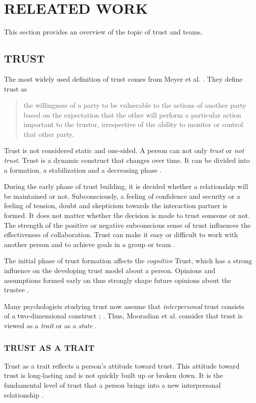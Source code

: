 \documentclass[sigchi]{acmart}
\begin{document}
\section{RELEATED WORK}
This section provides an overview of the topic of trust and teams.
\subsection{TRUST}
The most widely used definition of trust comes from Meyer et al. \citep[p. 712]{mayer1995integrative}. They define trust as
\begin{quote} \grqq{}the willingness of a party to be vulnerable to the actions of another party based on the expectation that the other will perform a particular action important to the trustor, irrespective of the ability to monitor or control that other party.\grqq{} \end{quote}

Trust is not considered static and one-sided. A person can not only \textit{trust} or \textit{not trust}. Trust is a dynamic construct that changes over time. It can be divided into a formation, a stabilization and a decreasing phase \citep[p. 396]{rousseau1998not}.

During the early phase of trust building, it is decided whether a relationship will be maintained or not. Subconsciously, a feeling of confidence and security or a feeling of tension, doubt and skepticism towards the interaction partner is formed.
It does not matter whether the decision is made to trust someone or not. The strength of the positive or negative subconscious sense of trust influences the effectiveness of collaboration. Trust can make it easy or difficult to work with another person and to achieve goals in a group or team \citep[p. 405-406]{bigley1998straining}.

The initial phase of trust formation affects the \textit{cognitive} Trust, which has a strong influence on the developing trust model about a person.
Opinions and assumptions formed early on thus strongly shape future opinions about the trustee \citep[pp. 461-462]{baldwin1992relational}.

Many psychologists studying trust now assume that \textit{interpersonal} trust consists of a two-dimensional construct \citep{johnson2005cognitive}; \citep{cook1980new}. Thus, Mooradian et al. consider that trust is viewed as a \textit{trait} or as a \textit{state} \citep[pp. 524-525]{mooradian2006trusts}.

\subsubsection{TRUST AS A TRAIT}
Trust as a trait reflects a person's attitude toward trust. This attitude toward trust is long-lasting and is not quickly built up or broken down. It is the fundamental level of trust that a person brings into a new interpersonal relationship \citep[p. 11]{couch1996assessment}. 
\end{document}
